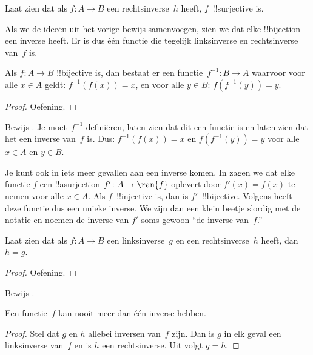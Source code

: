 \documentclass[../../../include/open-logic-section]{subfiles}
\begin{document}
\begin{prob}
Laat zien dat als $f\colon A \to B$ een rechtsinverse~$h$ heeft,
$f$~!!{surjective} is.
\end{prob}

\begin{explain}
  Als we de ideeën uit het vorige bewijs samenvoegen, zien we dat elke
  !!{bijection} een inverse heeft. Er is dus één functie die tegelijk
  linksinverse en rechtsinverse van~$f$ is.
\end{explain}

\begin{prop}
Als $f\colon A \to B$ !!{bijective} is, dan bestaat er een
functie~$f^{-1}\colon B \to A$ waarvoor voor alle $x \in A$ geldt:
$f^{-1}(f(x)) = x$, en voor alle $y \in B$: $f(f^{-1}(y)) = y$.
\end{prop}

\begin{proof}
Oefening.
\end{proof}

\begin{prob}
Bewijs . Je moet~$f^{-1}$
definiëren, laten zien dat dit een functie is en laten zien
dat het een inverse van~$f$ is. Dus: $f^{-1}(f(x)) = x$ en
$f(f^{-1}(y)) = y$ voor alle $x \in A$ en $y \in B$.
\end{prob}

\begin{explain}
Je kunt ook in iets meer gevallen aan een inverse komen. In
 zagen we dat elke functie $f$ een !!a{surjection} $f'
\colon A \to \ran{f}$ oplevert door $f'(x) = f(x)$ te nemen voor alle
$x \in A$. Als $f$~!!{injective} is, dan is $f'$~!!{bijective}.
Volgens  heeft deze functie dus een
unieke inverse. We zijn dan een klein beetje slordig met de notatie en
noemen de inverse van $f'$ soms gewoon ``de inverse van~$f$.''
\end{explain}

\begin{prop}%
  Laat zien dat als $f\colon A \to B$ een linksinverse~$g$ en een
  rechtsinverse~$h$ heeft, dan $h = g$.
\end{prop}

\begin{proof}
  Oefening.
\end{proof}

\begin{prob}
  Bewijs .
\end{prob}

\begin{prop}
Een functie~$f$ kan nooit meer dan één inverse hebben.
\end{prop}

\begin{proof}
  Stel dat $g$ en $h$ allebei inversen van~$f$ zijn. Dan is $g$ in elk
  geval een linksinverse van~$f$ en is $h$ een rechtsinverse. Uit
   volgt $g = h$.
\end{proof}
\end{document}
